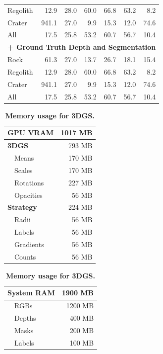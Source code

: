 \begin{table}[h]
\begin{tabular}[t]{|lrrrrrr|}
		Regolith                                       & 12.9  & 28.0 & 60.0 & 66.8 & 63.2 & 8.2  \\
		Crater                                         & 941.1 & 27.0 & 9.9  & 15.3 & 12.0 & 74.6 \\
		All                                            & 17.5  & 25.8 & 53.2 & 60.7 & 56.7 & 10.4 \\
		\multicolumn{7}{|l|}{\textbf{+ Ground Truth Depth and Segmentation}}                      \\
		Rock                                           & 61.3  & 27.0 & 13.7 & 26.7 & 18.1 & 15.4 \\
		Regolith                                       & 12.9  & 28.0 & 60.0 & 66.8 & 63.2 & 8.2  \\
		Crater                                         & 941.1 & 27.0 & 9.9  & 15.3 & 12.0 & 74.6 \\
		All                                            & 17.5  & 25.8 & 53.2 & 60.7 & 56.7 & 10.4 \\
		\hline
	\end{tabular}
\end{table}



\begin{table}[h]
	\centering
	\small
	\caption{\bfseries Memory usage for 3DGS.}
	\label{tab:memory_usage}
	\begin{minipage}[t]{0.48\linewidth}
		\centering
		\begin{tabular}[t]{|lr|}
			\hline
			\textbf{GPU VRAM} & 1017 MB \\\hline\hline
			\textbf{3DGS}     & 793 MB  \\
			~~Means           & 170 MB  \\
			~~Scales          & 170 MB  \\
			~~Rotations       & 227 MB  \\
			~~Opacities       & 56 MB   \\\hline
			\textbf{Strategy} & 224 MB  \\
			~~Radii           & 56 MB   \\
			~~Labels          & 56 MB   \\
			~~Gradients       & 56 MB   \\
			~~Counts          & 56 MB   \\\hline
		\end{tabular}
	\end{minipage}%
	\begin{minipage}[t]{0.48\linewidth}
		\centering
		\begin{tabular}[t]{|lr|}
			\hline
			\textbf{System RAM} & 1900 MB \\\hline\hline
			~~RGBs              & 1200 MB \\
			~~Depths            & 400 MB  \\
			~~Masks             & 200 MB  \\
			~~Labels            & 100 MB  \\
			\hline
		\end{tabular}
	\end{minipage}
\end{table}
